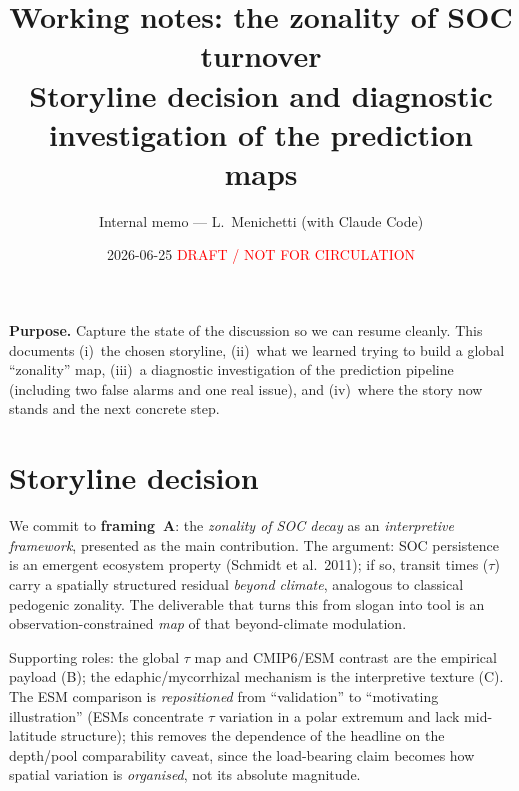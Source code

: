 \documentclass[11pt,a4paper]{article}
\title{\textbf{Working notes: the zonality of SOC turnover}\\[2pt]
\large Storyline decision and diagnostic investigation of the prediction maps}
\author{Internal memo --- L.\ Menichetti (with Claude Code)}
\date{2026-06-25 \quad\textcolor{red}{\small DRAFT / NOT FOR CIRCULATION}}
\begin{document}
\maketitle

\begin{center}\end{center}

\medskip
\noindent\textbf{Purpose.} Capture the state of the discussion so we can resume
cleanly. This documents (i)~the chosen storyline, (ii)~what we learned trying to
build a global ``zonality'' map, (iii)~a diagnostic investigation of the
prediction pipeline (including two false alarms and one real issue), and
(iv)~where the story now stands and the next concrete step.

\section{Storyline decision}

We commit to \textbf{framing~A}: the \emph{zonality of SOC decay} as an
\emph{interpretive framework}, presented as the main contribution. The argument:
SOC persistence is an emergent ecosystem property (Schmidt et al.\ 2011); if so, transit times
($\tau$) carry a spatially structured residual \emph{beyond climate}, analogous
to classical pedogenic zonality. The deliverable that turns this from slogan into
tool is an observation-constrained \emph{map} of that beyond-climate modulation.

Supporting roles: the global $\tau$ map and CMIP6/ESM contrast are the
empirical payload (B); the edaphic/mycorrhizal mechanism is the interpretive
texture (C). The ESM comparison is \emph{repositioned} from ``validation'' to
``motivating illustration'' (ESMs concentrate $\tau$ variation in a polar
extremum and lack mid-latitude structure); this removes the dependence of the
headline on the depth/pool comparability caveat, since the load-bearing claim
becomes how spatial variation is \emph{organised}, not its absolute magnitude.
\end{document}

